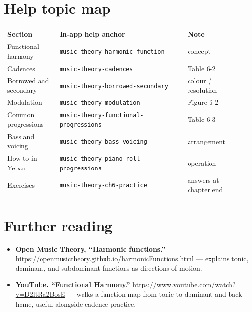 \section{Help topic map}

\begin{center}
\footnotesize
\begin{tabular}{p{0.22\linewidth}p{0.54\linewidth}p{0.16\linewidth}}
\toprule
Section & In-app help anchor & Note \\
\midrule
Functional harmony & \texttt{music-theory-harmonic-function} & concept \\
Cadences & \texttt{music-theory-cadences} & Table 6-2 \\
Borrowed and secondary & \texttt{music-theory-borrowed-secondary} & colour / resolution \\
Modulation & \texttt{music-theory-modulation} & Figure 6-2 \\
Common progressions & \texttt{music-theory-functional-progressions} & Table 6-3 \\
Bass and voicing & \texttt{music-theory-bass-voicing} & arrangement \\
How to in Yeban & \texttt{music-theory-piano-roll-progressions} & operation \\
Exercises & \texttt{music-theory-ch6-practice} & answers at chapter end \\
\bottomrule
\end{tabular}
\end{center}

\section*{Further reading}
\begin{itemize}
  \item \textbf{Open Music Theory, “Harmonic functions.”} \url{https://openmusictheory.github.io/harmonicFunctions.html} — explains tonic, dominant, and subdominant functions as directions of motion.
  \item \textbf{YouTube, “Functional Harmony.”} \url{https://www.youtube.com/watch?v=D2ltRa2BosE} — walks a function map from tonic to dominant and back home, useful alongside cadence practice.
\end{itemize}

